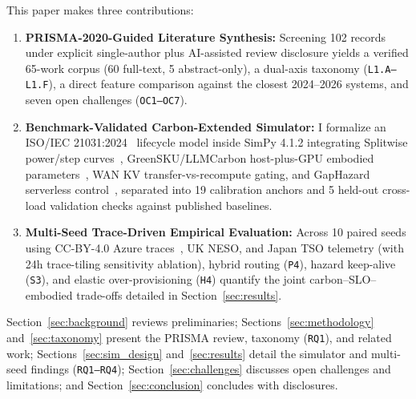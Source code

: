This paper makes three contributions:
\begin{enumerate}
    \item \textbf{PRISMA-2020-Guided Literature Synthesis:} Screening 102 records under explicit single-author plus AI-assisted review disclosure yields a verified 65-work corpus (60 full-text, 5 abstract-only), a dual-axis taxonomy (\texttt{L1.A--L1.F}), a direct feature comparison against the closest 2024--2026 systems, and seven open challenges (\texttt{OC1--OC7}).
    \item \textbf{Benchmark-Validated Carbon-Extended Simulator:} I formalize an ISO/IEC 21031:2024~\cite{iso2024sci} lifecycle model inside SimPy 4.1.2 integrating Splitwise power/step curves~\cite{patel2024splitwise}, GreenSKU/LLMCarbon host-plus-GPU embodied parameters~\cite{li2025ecoserve,faiz2024llmcarbon}, WAN KV transfer-vs-recompute gating, and GapHazard serverless control~\cite{sun2026lacere,fu2024serverlessllm}, separated into 19 calibration anchors and 5 held-out cross-load validation checks against published baselines.
    \item \textbf{Multi-Seed Trace-Driven Empirical Evaluation:} Across 10 paired seeds using CC-BY-4.0 Azure traces~\cite{azure2024trace}, UK NESO, and Japan TSO telemetry (with 24h trace-tiling sensitivity ablation), hybrid routing (\texttt{P4}), hazard keep-alive (\texttt{S3}), and elastic over-provisioning (\texttt{H4}) quantify the joint carbon--SLO--embodied trade-offs detailed in Section~\ref{sec:results}.
\end{enumerate}

Section~\ref{sec:background} reviews preliminaries; Sections~\ref{sec:methodology} and~\ref{sec:taxonomy} present the PRISMA review, taxonomy (\texttt{RQ1}), and related work; Sections~\ref{sec:sim_design} and~\ref{sec:results} detail the simulator and multi-seed findings (\texttt{RQ1--RQ4}); Section~\ref{sec:challenges} discusses open challenges and limitations; and Section~\ref{sec:conclusion} concludes with disclosures.
